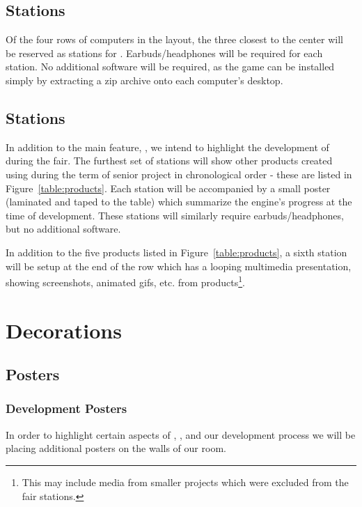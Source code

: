\documentclass{GlobalDocument}
\begin{document}
\section{\ourgame{} Stations}
Of the four rows of computers in the layout, the three closest to the center will be reserved as stations for \ourgame{}. Earbuds/headphones will be required for each station. No additional software will be required, as the game can be installed simply by extracting a zip archive onto each computer's desktop.

\section{\ourengine{} Stations}
In addition to the main feature, \ourgame{}, we intend to highlight the development of \ourengine{} during the fair. The furthest set of stations will show other products created using \ourengine{} during the term of senior project in chronological order - these are listed in Figure~\ref{table:products}. Each station will be accompanied by a small poster (laminated and taped to the table) which summarize the engine's progress at the time of development. These stations will similarly require earbuds/headphones, but no additional software.

In addition to the five products listed in Figure~\ref{table:products}, a sixth station will be setup at the end of the row which has a looping multimedia presentation, showing screenshots, animated gifs, etc. from \ourengine{} products\footnote{This may include media from smaller projects which were excluded from the fair stations.}.

\chapter{Decorations}

\section{Posters}
\subsection{Development Posters}
In order to highlight certain aspects of \ourgame{}, \ourengine{}, and our development process we will be placing additional posters on the walls of our room.
\end{document}
